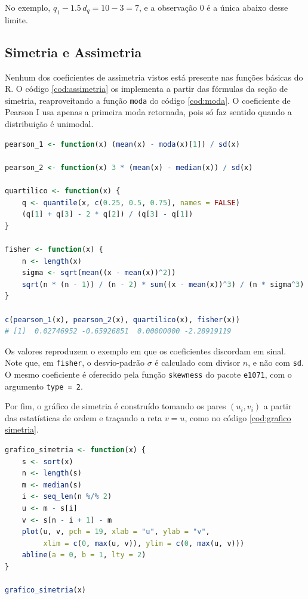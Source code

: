 No exemplo, $q_1 - 1.5\, d_q = 10 - 3 = 7$, e a observação $0$ é a única abaixo desse
limite.

\subsection{Simetria e Assimetria}

Nenhum dos coeficientes de assimetria vistos está presente nas funções básicas do R.
O código \ref{cod:assimetria} os implementa a partir das fórmulas da seção de simetria,
reaproveitando a função \texttt{moda} do código \ref{cod:moda}.
O coeficiente de Pearson I usa apenas a primeira moda retornada, pois só faz sentido
quando a distribuição é unimodal.

\begin{lstlisting}[language=R, caption={Coeficientes de Assimetria}, label={cod:assimetria}]
pearson_1 <- function(x) (mean(x) - moda(x)[1]) / sd(x)

pearson_2 <- function(x) 3 * (mean(x) - median(x)) / sd(x)

quartilico <- function(x) {
    q <- quantile(x, c(0.25, 0.5, 0.75), names = FALSE)
    (q[1] + q[3] - 2 * q[2]) / (q[3] - q[1])
}

fisher <- function(x) {
    n <- length(x)
    sigma <- sqrt(mean((x - mean(x))^2))
    sqrt(n * (n - 1)) / (n - 2) * sum((x - mean(x))^3) / (n * sigma^3)
}

c(pearson_1(x), pearson_2(x), quartilico(x), fisher(x))
# [1]  0.02746952 -0.65926851  0.00000000 -2.28919119
\end{lstlisting}

Os valores reproduzem o exemplo em que os coeficientes discordam em sinal.
Note que, em \texttt{fisher}, o desvio-padrão $\sigma$ é calculado com divisor $n$, e
não com \texttt{sd}.
O mesmo coeficiente é oferecido pela função \texttt{skewness} do pacote \texttt{e1071},
com o argumento \texttt{type = 2}.

Por fim, o gráfico de simetria é construído tomando os pares $(u_i, v_i)$ a partir das
estatísticas de ordem e traçando a reta $v = u$, como no código \ref{cod:grafico simetria}.

\begin{lstlisting}[language=R, caption={Gráfico de Simetria}, label={cod:grafico simetria}]
grafico_simetria <- function(x) {
    s <- sort(x)
    n <- length(s)
    m <- median(s)
    i <- seq_len(n %/% 2)
    u <- m - s[i]
    v <- s[n - i + 1] - m
    plot(u, v, pch = 19, xlab = "u", ylab = "v",
         xlim = c(0, max(u, v)), ylim = c(0, max(u, v)))
    abline(a = 0, b = 1, lty = 2)
}

grafico_simetria(x)
\end{lstlisting}

